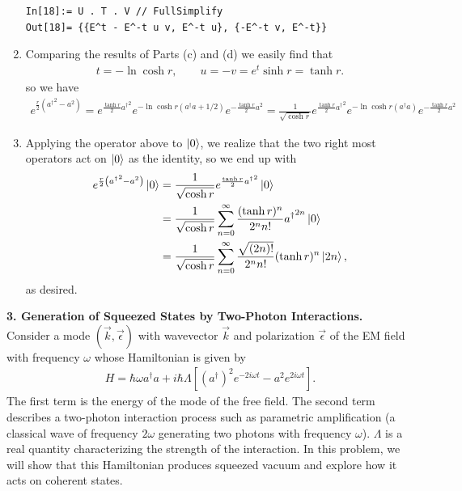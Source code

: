 \documentclass{article}
\theoremstyle{definition}
\newcommand{\f}[2]{\frac{#1}{#2}}
\newcommand{\lp}{\left(}
\newcommand{\rp}{\right)}
\newcommand{\lb}{\left[}
\newcommand{\rb}{\right]}
\begin{document}
\begin{enumerate}[label=(\alph*)]
\begin{lstlisting}
In[18]:= U . T . V // FullSimplify
Out[18]= {{E^t - E^-t u v, E^-t u}, {-E^-t v, E^-t}}
\end{lstlisting}

\item Comparing the results of Parts (c) and (d) we easily find that
\begin{align*}
t = -\ln \cosh r, \quad\quad u = -v = e^t \sinh r = \tanh r .
\end{align*}
so we have
\begin{align*}
e^{\f{r}{2}\lp {a^\dagger}^2 - a^2 \rp} = e^{\f{\tanh r }{2} {a^\dagger}^2} e^{-\ln \cosh r  \lp a^\dagger a + 1/2 \rp} e^{-\f{\tanh r }{2} a^2} = 
\f{1}{\sqrt{\cosh r}} 
e^{\f{\tanh r }{2} {a^\dagger}^2} e^{-\ln \cosh r  ( a^\dagger a ) } e^{-\f{\tanh r }{2} a^2}
\end{align*}


\item Applying the operator above to $\ket{0}$, we realize that the two right most operators act on $\ket{0}$ as the identity, so we end up with
\begin{align*}
e^{\f{r}{2}\lp {a^\dagger}^2 - a^2 \rp} \ket{0} 
&= \f{1}{\sqrt{\cosh r}} e^{\f{\tanh r }{2} {a^\dagger}^2}  \ket{0} \\
&= \f{1}{\sqrt{\cosh r}} \sum_{n=0}^\infty  \f{(\tanh r)^n}{2^n n!} {a^\dagger}^{2n}  \ket{0} \\
&= \f{1}{\sqrt{\cosh r}} \sum_{n=0}^\infty \f{\sqrt{(2n)!}}{2^n n!} (\tanh r)^{n} \ket{2n},
\end{align*}
as desired. 

\end{enumerate}



\noindent \textbf{3. Generation of Squeezed States by Two-Photon Interactions.}\\


\noindent Consider a mode $(\vec{k}, \vec{\epsilon})$ with wavevector $\vec{k}$ and polarization $\vec{\epsilon}$ of the EM field with frequency $\omega$ whose Hamiltonian is given by 
\begin{align*}
H = \hbar \omega a^\dagger a + i\hbar \Lambda \lb (a^\dagger)^2 e^{-2i\omega t} - a^2 e^{2i \omega t } \rb.
\end{align*}
The first term is the energy of the mode of the free field. The second term describes a
two-photon interaction process such as parametric amplification (a classical wave of frequency $2\omega$
generating two photons with frequency $\omega$). $\Lambda$ is a real quantity characterizing the strength of the interaction. In this problem, we will show that this Hamiltonian produces squeezed vacuum and explore how
it acts on coherent states.
\end{document}
